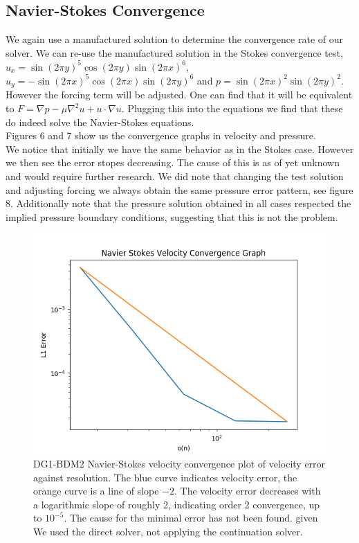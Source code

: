 \documentclass[11pt,twoside,a4paper]{article}
\begin{document}
\subsection{Navier-Stokes Convergence}

We again use a manufactured solution to determine the convergence rate of our solver.
We can re-use the manufactured solution in the Stokes convergence test, $u_x = \sin(2 \pi y)^5 \cos(2 \pi y)\sin(2 \pi x)^6$, $u_y= -\sin(2 \pi x)^5 \cos(2 \pi x) \sin(2 \pi y)^6$ and $p = \sin(2 \pi x)^2 \sin(2 \pi y)^2$.\\
However the forcing term will be adjusted. One can find that it will be equivalent to $F = \nabla p - \mu \nabla^2 u + u \cdot \nabla u$.
Plugging this into the equations we find that these do indeed solve the Navier-Stokes equations.\\
Figures 6 and 7 show us the convergence graphs in velocity and pressure.\\
We notice that initially we have the same behavior as in the Stokes case. However we then see the error stopes decreasing. The cause of this is as of yet unknown and would require further research. We did note that changing the test solution and adjusting forcing we always obtain the same pressure error pattern, see figure 8. Additionally note that the pressure solution obtained in all cases respected the implied pressure boundary conditions, suggesting that this is not the problem.

\begin{figure}
  \includegraphics[width=\linewidth]{navier_stokes_convergence_dbc0.png}
  \caption{DG1-BDM2 Navier-Stokes velocity convergence plot of velocity error against resolution.  The blue curve indicates velocity error, the orange curve is a line of slope $-2$.  The velocity error decreases with a logarithmic slope of roughly 2, indicating order 2 convergence, up to $10^{-5}$. The cause for the minimal error has not been found. given We used the direct solver, not applying the continuation solver.}
\end{figure}
\end{document}
